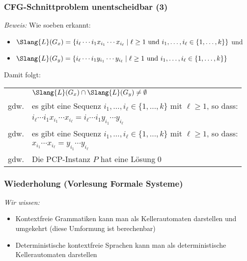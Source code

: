 \documentclass[aspectratio=1610,onlymath]{beamer}
\begin{document}
\begin{frame}[t]\frametitle{CFG-Schnittproblem unentscheidbar (3)}

\emph{Beweis:} Wie soeben erkannt:
\begin{itemize}
\item $\Slang{L}(G_x)=\{ i_\ell\cdots i_1 x_{i_1}\cdots x_{i_\ell}\mid \ell\geq 1\text{ und } i_1,\ldots,i_\ell\in\{1,\ldots,k\}\}$ und
\item $\Slang{L}(G_y)=\{ i_\ell\cdots i_1 y_{i_1}\cdots y_{i_\ell}\mid \ell\geq 1\text{ und } i_1,\ldots,i_\ell\in\{1,\ldots,k\}\}$
\end{itemize}\bigskip\pause

Damit folgt:\medskip

\begin{tabular}{rl}
& $\Slang{L}(G_x)\cap\Slang{L}(G_y)\neq\emptyset$\\\pause
gdw. & es gibt eine Sequenz $i_1,\ldots,i_\ell\in\{1,\ldots,k\}$ mit $\ell\geq 1$, so dass:\\
	& $ i_\ell\cdots i_1 x_{i_1}\cdots x_{i_\ell} = i_\ell\cdots i_1 y_{i_1}\cdots y_{i_\ell}$\\\pause
gdw. & es gibt eine Sequenz $i_1,\ldots,i_\ell\in\{1,\ldots,k\}$ mit $\ell\geq 1$, so dass:\\
	& $ x_{i_1}\cdots x_{i_\ell} = y_{i_1}\cdots y_{i_\ell}$\\\pause
gdw. &  Die PCP-Instanz $P$ hat eine Lösung\qed\\
\end{tabular}

\end{frame}


\begin{frame}\frametitle{Wiederholung (Vorlesung Formale Systeme)}

\emph{Wir wissen:}
\begin{itemize}
\item Kontextfreie Grammatiken kann man als Kellerautomaten darstellen und umgekehrt
 (diese Umformung ist berechenbar)
\item Deterministische kontextfreie Sprachen kann man als deterministische Kellerautomaten darstellen
\end{itemize}
\bigskip


\end{frame}
\end{document}

